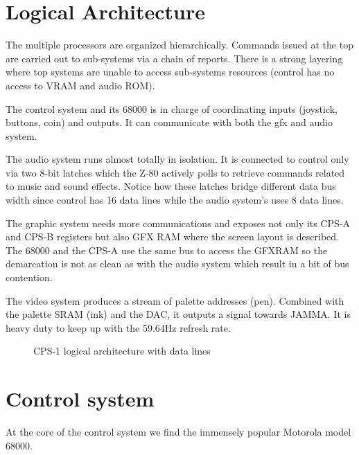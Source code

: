 \section{Logical Architecture}
The multiple processors are organized hierarchically. Commands issued at the top are carried out to sub-systems via a chain of reports. There is a strong layering where top systems are unable to access sub-systems resources (control has no access to VRAM and audio ROM).


The control system and its 68000 is in charge of coordinating inputs (joystick, buttons, coin) and outputs. It can communicate with both the gfx and audio system.

The audio system runs almost totally in isolation. It is connected to control only via two 8-bit latches which the Z-80 actively polls to retrieve commands related to music and sound effects. Notice how these latches bridge different data bus width since control has 16 data lines while the audio system's uses 8 data lines.

The graphic system needs more communications and exposes not only its CPS-A and CPS-B registers but also GFX RAM where the screen layout is described. The 68000 and the CPS-A use the same bus to access the GFXRAM so the demarcation is not as clean as with the audio system which result in a bit of bus contention.  

The video system produces a stream of palette addresses (pen). Combined with the palette SRAM (ink) and the DAC, it outputs a signal towards JAMMA.
It is heavy duty to keep up with the 59.64Hz refresh rate.

\begin{figure}[H]
  \caption*{CPS-1 logical architecture with data lines}
  \label{cps1_arch}
  \end{figure}



\section{Control system}
At the core of the control system we find the immensely popular Motorola model 68000.

